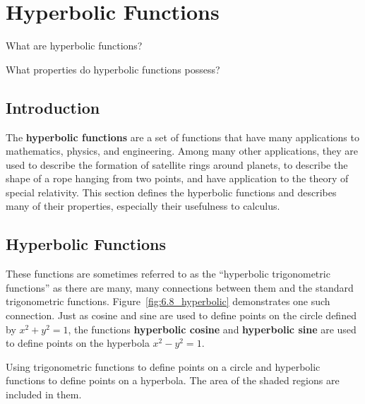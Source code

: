 \section{Hyperbolic Functions}\label{sec:hyperbolic}

\begin{goals}
\item What are hyperbolic functions?  
\item What properties do hyperbolic functions possess?
\end{goals} 

\subsection*{Introduction}

The \textbf{hyperbolic functions} are a set of functions that have many applications to mathematics, physics, and engineering. Among many other applications, they are used to describe the formation of satellite rings around planets, to describe the shape of a rope hanging from two points, and have application to the theory of special relativity. This section defines the hyperbolic functions and describes many of their properties, especially their usefulness to calculus.


\subsection*{Hyperbolic Functions}

These functions are sometimes referred to as the ``hyperbolic trigonometric functions'' as there are many, many connections between them and the standard trigonometric functions. Figure~\ref{fig:6.8_hyperbolic} demonstrates one such connection. Just as cosine and sine are used to define points on the circle defined by $x^2+y^2=1$, the functions \textbf{hyperbolic cosine} and \textbf{hyperbolic sine} are used to define points on the hyperbola $x^2-y^2=1$.

\begin{marginfigure} %
\captionsetup[subfigure]{labelformat=empty}


\caption{Using trigonometric functions to define points on a circle and hyperbolic functions to define points on a hyperbola. The area of the shaded regions are included in them.}
\label{fig:6.8_hyperbolic}
\end{marginfigure}

